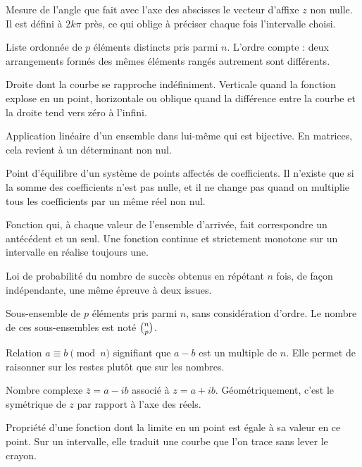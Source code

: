 Mesure de l'angle que fait avec l'axe des abscisses le vecteur d'affixe $z$
non nulle. Il est défini à $2k\pi$ près, ce qui oblige à préciser chaque fois
l'intervalle choisi.

Liste ordonnée de $p$ éléments distincts pris parmi $n$. L'ordre compte : deux
arrangements formés des mêmes éléments rangés autrement sont différents.

Droite dont la courbe se rapproche indéfiniment. Verticale quand la fonction
explose en un point, horizontale ou oblique quand la différence entre la
courbe et la droite tend vers zéro à l'infini.

Application linéaire d'un ensemble dans lui-même qui est bijective. En
matrices, cela revient à un déterminant non nul.


Point d'équilibre d'un système de points affectés de coefficients. Il n'existe
que si la somme des coefficients n'est pas nulle, et il ne change pas quand on
multiplie tous les coefficients par un même réel non nul.

Fonction qui, à chaque valeur de l'ensemble d'arrivée, fait correspondre un
antécédent et un seul. Une fonction continue et strictement monotone sur un
intervalle en réalise toujours une.

Loi de probabilité du nombre de succès obtenus en répétant $n$ fois, de façon
indépendante, une même épreuve à deux issues.


Sous-ensemble de $p$ éléments pris parmi $n$, sans considération d'ordre. Le
nombre de ces sous-ensembles est noté $\combi{p}{n}$.

Relation $a \equiv b \pmod n$ signifiant que $a-b$ est un multiple de $n$.
Elle permet de raisonner sur les restes plutôt que sur les nombres.

Nombre complexe $\overline z = a-ib$ associé à $z = a+ib$. Géométriquement,
c'est le symétrique de $z$ par rapport à l'axe des réels.

Propriété d'une fonction dont la limite en un point est égale à sa valeur en
ce point. Sur un intervalle, elle traduit une courbe que l'on trace sans lever
le crayon.

